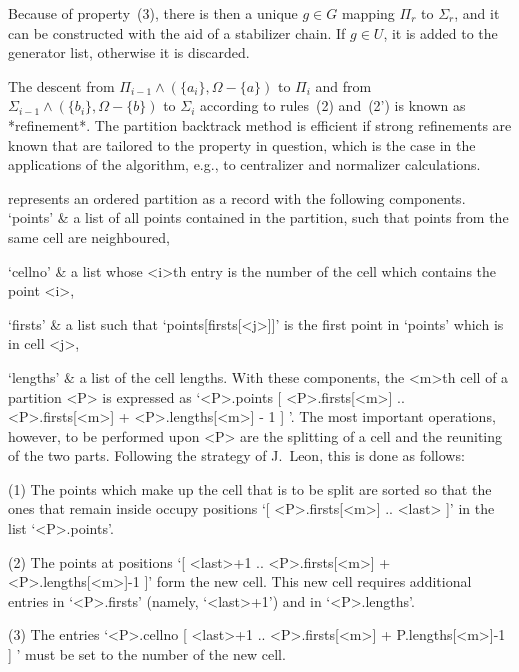 Because of property~(3), there is then a  unique $g\in G$ mapping $\Pi_r$
to $\Sigma_r$,  and it can be constructed   with the aid of  a stabilizer
chain.  If $g\in U$, it  is added to the  generator list, otherwise it is
discarded.

The descent from  $\Pi_{i-1}\wedge (\{a_i\},\Omega-\{a\})$ to $\Pi_i$ and
from $\Sigma_{i-1}\wedge (\{b_i\}, \Omega-\{b\})$ to $\Sigma_i$ according
to rules~(2)  and~(2') is known as  *refinement*. The partition backtrack
method is efficient if strong refinements are known  that are tailored to
the property  in question, which is  the case in  the applications of the
algorithm, e.g., to centralizer and normalizer calculations.

\null
{}%

{\GAP} represents  an ordered partition as  a  record with  the following
components.
\beginitems
`points' &
        a list of all points contained in the partition, such that points
        from the same cell are neighboured,

`cellno' &
        a list whose <i>th entry is the number of the cell which contains
        the point <i>,

`firsts' &
        a list  such that  `points[firsts[<j>]]'  is  the first point  in
        `points' which is in cell <j>,

`lengths' &
        a list of the cell lengths.
\enditems
With these components, the <m>th cell of a  partition <P> is expressed as
`<P>.points{ [ <P>.firsts[<m>]  .. <P>.firsts[<m>] + <P>.lengths[<m>] - 1
] }'.  The most important operations, however,  to  be performed upon <P>
are the splitting of a cell and the reuniting of the two parts. Following
the strategy of J.~Leon, this is done as follows:

(1) The points which make up  the cell that is  to be split are sorted so
that the ones that  remain inside occupy  positions `[ <P>.firsts[<m>] ..
<last> ]' in the list `<P>.points'.

(2)   The  points  at   positions   `[  <last>+1 ..   <P>.firsts[<m>]   +
<P>.lengths[<m>]-1  ]'  form   the new   cell. This    new  cell requires
additional  entries   in  `<P>.firsts'   (namely, `<last>+1')    and   in
`<P>.lengths'.

(3) The  entries  `<P>.cellno{      [ <last>+1 ..      <P>.firsts[<m>]  +
P.lengths[<m>]-1 ] }' must be set to the number of the new cell.

